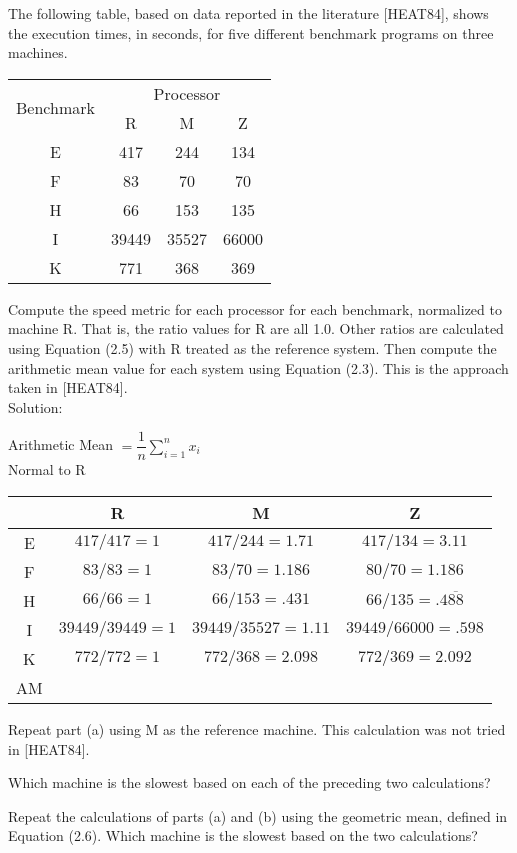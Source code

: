 \documentclass[12pt,largemargins]{homework}
\begin{document}
 The following table, based on data reported in the literature [HEAT84], shows
the execution times, in seconds, for five different benchmark programs on three
machines.\\
\begin{center}

\begin{tabular}{|c|c|c|c|}
	\hline
	\multirow{2}{*}{Benchmark} & \multicolumn{3}{|c|}{Processor} \\
	\cline{2-3}
	& R & M & Z \\
	\hline
	E & 417 & 244 & 134 \\
	\hline
	F & 83 & 70 & 70 \\
	\hline
	H & 66 & 153 & 135\\
	\hline 
	I & 39449 & 35527 & 66000\\
	\hline
	K & 771 & 368 & 369 \\
	\hline
\end{tabular}
\end{center}
\begin{alphaparts}
\item
Compute the speed metric for each processor for each benchmark, normalized to
machine R. That is, the ratio values for R are all 1.0. Other ratios are calculated
using Equation (2.5) with R treated as the reference system. Then compute the
arithmetic mean value for each system using Equation (2.3). This is the approach
taken in [HEAT84].\\
Solution: \\
\begin{center}
Arithmetic Mean $= \dfrac{1}{n} \sum_{i=1}^n x_i$ \\
Normal to R\\
\begin{tabular}{|c|c|c|c|}
	\hline
	& R & M & Z\\
	\hline
	E & $417/417 = 1$ & $417/244 = 1.71$ & $417/134 = 3.11$\\
	\hline
	F & $83/83 = 1$ & $83/70 = 1.186$ & $80/70 = 1.186$\\
	\hline
	H & $66/66 = 1$ & $66/153 = .431$ & $ 66/135 = .4\overline{88}$\\
	\hline
	I & $ 39449/39449 = 1$ & $ 39449/35527 = 1.11$ & $39449/66000 = .598$ \\
	\hline
	K & $772/772 = 1$ & $772/368 = 2.098$ & $772/369=2.092$\\
	\hline 
	AM & 
\end{tabular}
\end{center}
\item
Repeat part (a) using M as the reference machine. This calculation was not tried in
[HEAT84].\\
\item
Which machine is the slowest based on each of the preceding two calculations?\\
\item 
Repeat the calculations of parts (a) and (b) using the geometric mean, defined in
Equation (2.6). Which machine is the slowest based on the two calculations?\\
\end{alphaparts}
\end{document}
